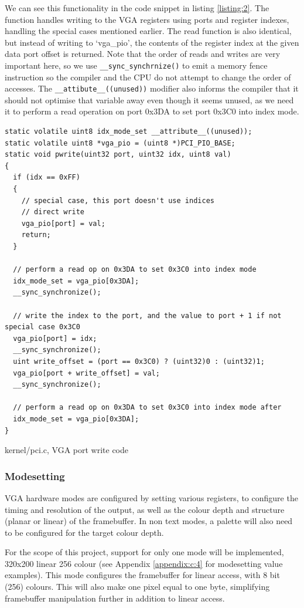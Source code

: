 We can see this functionality in the code snippet in listing \ref{listing:2}. The function
handles writing to the VGA registers using ports and register indexes, handling the special cases
mentioned earlier. The read function is also identical, but instead of writing to 
`vga\_pio', the contents of the register index at the given data port offset is returned. Note
that the order of reads and writes are very important here, so we use \texttt{__sync_synchrnize()}
to emit a memory fence instruction so the compiler and the CPU do not attempt to change the order
of accesses. The \texttt{__attibute__((unused))} modifier also informs the compiler that
it should not optimise that variable away even though it seems unused, as we need it to perform
a read operation on port 0x3DA to set port 0x3C0 into index mode.

\begin{listing}[H]
    \begin{verbatim}
static volatile uint8 idx_mode_set __attribute__((unused));
static volatile uint8 *vga_pio = (uint8 *)PCI_PIO_BASE;
static void pwrite(uint32 port, uint32 idx, uint8 val)
{
  if (idx == 0xFF)
  {
    // special case, this port doesn't use indices
    // direct write
    vga_pio[port] = val;
    return;
  }

  // perform a read op on 0x3DA to set 0x3C0 into index mode
  idx_mode_set = vga_pio[0x3DA];
  __sync_synchronize();

  // write the index to the port, and the value to port + 1 if not special case 0x3C0
  vga_pio[port] = idx;
  __sync_synchronize();
  uint write_offset = (port == 0x3C0) ? (uint32)0 : (uint32)1;
  vga_pio[port + write_offset] = val;
  __sync_synchronize();

  // perform a read op on 0x3DA to set 0x3C0 into index mode after
  idx_mode_set = vga_pio[0x3DA];
}
    \end{verbatim}
    \caption{kernel/pci.c, VGA port write code}
    \label{listing:2}
\end{listing}
\subsubsection{Modesetting}
VGA hardware modes are configured by setting various registers, to configure the timing and resolution
of the output, as well as the colour depth and structure (planar or linear) of the framebuffer.
In non text modes, a palette will also need to be configured for the target colour depth.

For the scope of this project, support for only one mode will be implemented, 320x200 linear 256 colour 
(see Appendix \ref{appendix:c:4} for modesetting value examples).
This mode configures the framebuffer for linear access, with 8 bit (256) colours. This will
also make one pixel equal to one byte, simplifying framebuffer manipulation further in addition to linear access.

